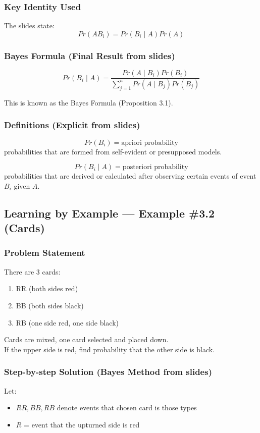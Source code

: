 \documentclass{article}
\begin{document}
\subsubsection*{Key Identity Used}
The slides state:
\[
Pr(AB_i)=Pr(B_i\mid A)Pr(A)
\]

\subsubsection*{Bayes Formula (Final Result from slides)}
\[
Pr(B_i\mid A)=
\frac{Pr(A\mid B_i)Pr(B_i)}
{\sum_{j=1}^{n}Pr(A\mid B_j)Pr(B_j)}
\]

This is known as the Bayes Formula (Proposition 3.1).

\subsubsection*{Definitions (Explicit from slides)}
\[
Pr(B_i) = \text{apriori probability}
\]
probabilities that are formed from self-evident or presupposed models.

\[
Pr(B_i\mid A) = \text{posteriori probability}
\]
probabilities that are derived or calculated after observing certain events of event $B_i$ given $A$.

\subsection{Learning by Example --- Example \#3.2 (Cards)}

\subsubsection*{Problem Statement}
There are 3 cards:
\begin{enumerate}
\item RR (both sides red)
\item BB (both sides black)
\item RB (one side red, one side black)
\end{enumerate}

Cards are mixed, one card selected and placed down.\\
If the upper side is red, find probability that the other side is black.

\subsubsection*{Step-by-step Solution (Bayes Method from slides)}
Let:
\begin{itemize}
\item $RR,BB,RB$ denote events that chosen card is those types
\item $R$ = event that the upturned side is red
\end{itemize}
\end{document}
